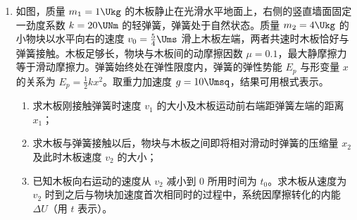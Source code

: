 \documentclass[\gkver]{gaokaozhenti}
\begin{document}
\begin{enumerate}
{\begin{enumerate}

	\item
	带电粒子在该磁场中运动的半径与圆形磁场半径关系为 $r = \sqrt{3}R$，根据几何关系可知，带电粒子在该磁场中运动的轨迹一定为劣弧，故劣弧所对应轨迹圆的弦为磁场圆的直径时粒子在磁场中运动的时间最长。则相对应的运动轨迹和弦以及圆心 M 的位置如图所示：

\end{enumerate}
}

\item
如图，质量 $m_{1}=1\Ukg$ 的木板静止在光滑水平地面上，右侧的竖直墙面固定一劲度系数 $k=20\UNm$ 的轻弹簧，弹簧处于自然状态。质量 $m_{2}=4\Ukg$ 的小物块以水平向右的速度 $v_{0}=\frac{5}{4}\Ums$ 滑上木板左端，两者共速时木板恰好与弹簧接触。木板足够长，物块与木板间的动摩擦因数 $\mu=0.1$，最大静摩擦力等于滑动摩擦力。弹簧始终处在弹性限度内，弹簧的弹性势能 $E_{p}$ 与形变量 $x$ 的关系为 $E_{p}=\frac{1}{2}kx^{2}$。取重力加速度 $g=10\Umsq$，结果可用根式表示。
\begin{enumerate}
	\item
	求木板刚接触弹簧时速度 $v_{1}$ 的大小及木板运动前右端距弹簧左端的距离 $x_{1}$；
	\item
	求木板与弹簧接触以后，物块与木板之间即将相对滑动时弹簧的压缩量 $x_{2}$ 及此时木板速度 $v_{2}$ 的大小；
	\item
	已知木板向右运动的速度从 $v_{2}$ 减小到 0 所用时间为 $t_{0}$。求木板从速度为 $v_{2}$ 时到之后与物块加速度首次相同时的过程中，系统因摩擦转化的内能 $\Delta U$（用 $t$ 表示）。
\end{enumerate}
\end{enumerate}
\end{document}
